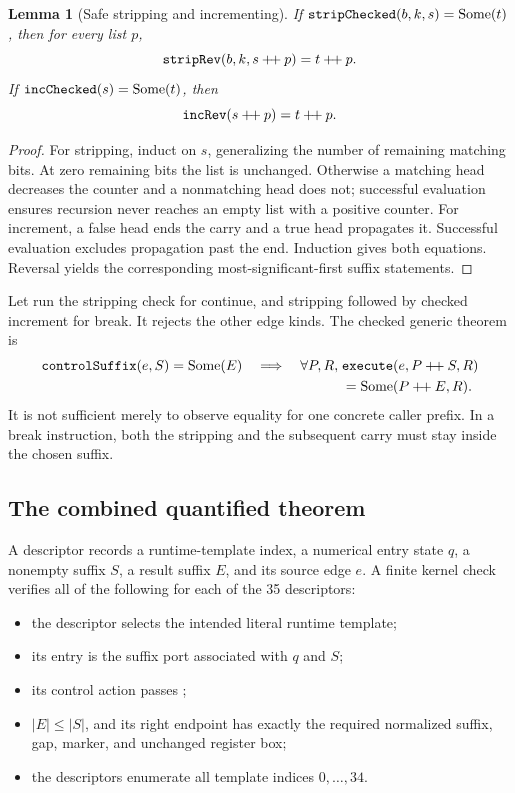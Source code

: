 \documentclass[11pt,letterpaper]{article}
\newtheorem{lemma}[theorem]{Lemma}
\theoremstyle{definition}
\newcommand{\code}[1]{\texttt{\detokenize{#1}}}
\newcommand{\Some}{\operatorname{Some}}
\begin{document}
\begin{lemma}[Safe stripping and incrementing]
If $\code{stripChecked}(b,k,s)=\Some(t)$, then for every list $p$,
\[
 \code{stripRev}(b,k,s\mathbin{+\!+}p)=t\mathbin{+\!+}p.
\]
If $\code{incChecked}(s)=\Some(t)$, then
\[
 \code{incRev}(s\mathbin{+\!+}p)=t\mathbin{+\!+}p.
\]
\end{lemma}

\begin{proof}
For stripping, induct on $s$, generalizing the number of remaining matching
bits. At zero remaining bits the list is unchanged. Otherwise a matching head
decreases the counter and a nonmatching head does not; successful evaluation
ensures recursion never reaches an empty list with a positive counter.
For increment, a false head ends the carry and a true head propagates it.
Successful evaluation excludes propagation past the end. Induction gives both
equations. Reversal yields the corresponding most-significant-first suffix
statements.
\end{proof}

Let \code{controlSuffix} run the stripping check for continue, and stripping
followed by checked increment for break. It rejects the other edge kinds.
The checked generic theorem is
\[
\begin{split}
 \code{controlSuffix}(e,S)=\Some(E)
 \quad\Longrightarrow\quad
 \forall P,R,\;&\code{execute}(e,P\mathbin{+\!+}S,R)\\
 &=\Some(P\mathbin{+\!+}E,R).
\end{split}
\]
It is not sufficient merely to observe equality for one concrete caller
prefix. In a break instruction, both the stripping and the subsequent carry
must stay inside the chosen suffix.

\subsection{The combined quantified theorem}

A descriptor records a runtime-template index, a numerical entry state $q$,
a nonempty suffix $S$, a result suffix $E$, and its source edge $e$. A finite
kernel check verifies all of the following for each of the 35 descriptors:

\begin{itemize}
\item the descriptor selects the intended literal runtime template;
\item its entry is the suffix port associated with $q$ and $S$;
\item its control action passes \code{controlSuffix};
\item $|E|\leq|S|$, and its right endpoint has exactly the required normalized
suffix, gap, marker, and unchanged register box;
\item the descriptors enumerate all template indices $0,\ldots,34$.
\end{itemize}
\end{document}
